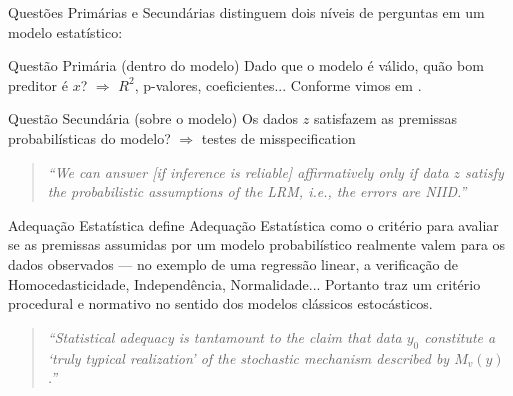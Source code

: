 \documentclass{beamer}
\begin{document}
	\begin{frame}{Questões Primárias e Secundárias}
		\textcite{mayo2004methodology} distinguem dois níveis
		de perguntas em um modelo estatístico:
		
		\vspace{0.2mm}
		
		\begin{block}{Questão Primária (dentro do modelo)}
			Dado que o modelo é válido, quão bom preditor é $x$? \quad $\Rightarrow$ $R^2$, p-valores, coeficientes... Conforme vimos em \textcite{santos2023porto}.
		\end{block}
		
		\begin{block}{Questão Secundária (sobre o modelo)}
			Os dados $z$ satisfazem as premissas probabilísticas
			do modelo? \quad $\Rightarrow$ testes de misspecification
		\end{block}
		
		\vspace{0.2mm}
		
		\begin{quote}
			\footnotesize\textit{``We can answer [if inference is reliable]
				affirmatively only if data $z$ satisfy the probabilistic
				assumptions of the LRM, i.e., the errors are NIID.''}
			\hfill \parencite{mayo2004methodology}
		\end{quote}
		
	\end{frame}
	
	\begin{frame}{Adequação Estatística}
		\textcite{spanos2007curve} define Adequação Estatística como o
		critério para avaliar se as premissas assumidas por um modelo
		probabilístico realmente valem para os dados observados — no
		exemplo de uma regressão linear, a verificação de
		Homocedasticidade, Independência, Normalidade... Portanto traz
		um critério procedural e normativo no sentido dos modelos
		clássicos estocásticos.
		
		\vspace{5mm}
		
		\begin{quote}
			\textit{``Statistical adequacy is tantamount to the claim
				that data $y_0$ constitute a `truly typical realization' of
				the stochastic mechanism described by $M_v(y)$.''}
			\hfill \parencite{spanos2007curve}
		\end{quote}
		
	\end{frame}
		
\end{document}
